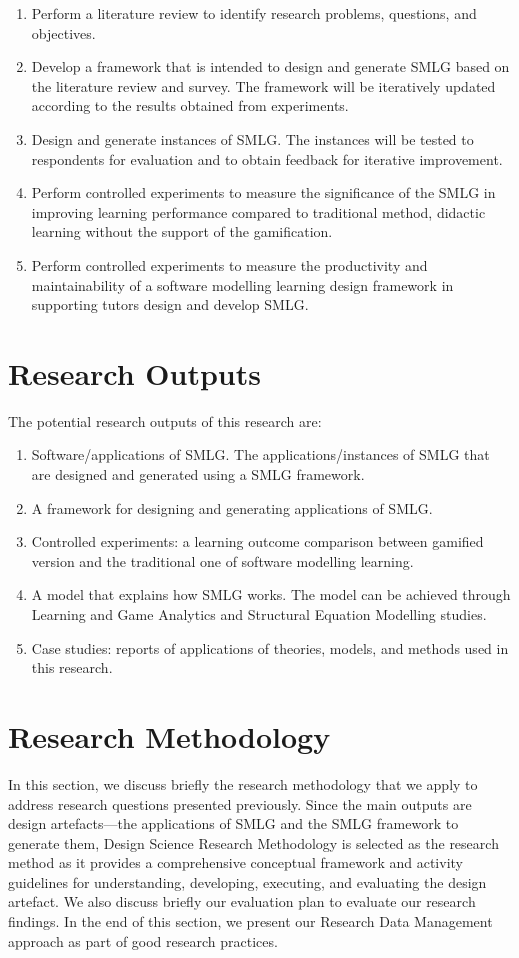 \documentclass[12pt, a4paper]{report}
\begin{document}
{\begin{enumerate}
\item Perform a literature review to identify research problems, questions, and objectives. 
\item Develop a framework that is intended to design and generate SMLG based on the literature review and survey. The framework will be iteratively updated according to the results obtained from experiments. 
\item Design and generate instances of SMLG. The instances will be tested to respondents for evaluation and to obtain feedback for iterative improvement. 
\item Perform controlled experiments to measure the significance of the SMLG in improving learning performance compared to traditional method, didactic learning without the support of the gamification.
\item Perform controlled experiments to measure the productivity and maintainability of a software modelling learning design framework in supporting tutors design and develop SMLG. 
\end{enumerate}

\section{Research Outputs}
The potential research outputs of this research are:
\begin{enumerate}
\item Software/applications of SMLG. The applications/instances of SMLG that are designed and generated using a SMLG framework. 
\item A framework for designing and generating applications of SMLG.
\item Controlled experiments: a learning outcome comparison between gamified version and the traditional one of software modelling learning.
\item A model that explains how SMLG works. The model can be achieved through Learning and Game Analytics and Structural Equation Modelling studies.
\item Case studies: reports of applications of theories, models, and methods used in this research.
\end{enumerate}

\section{Research Methodology}
In this section, we discuss briefly the research methodology that we apply to address research questions presented previously. Since the main outputs are design artefacts---the applications of SMLG and the SMLG framework to generate them, Design Science Research Methodology \cite{peffers2007design} is selected as the research method as it provides a comprehensive conceptual framework and activity guidelines for understanding, developing, executing, and evaluating the design artefact. We also discuss briefly our evaluation plan to evaluate our research findings. In the end of this section, we present our Research Data Management approach as part of good research practices.   

}
\end{document}
